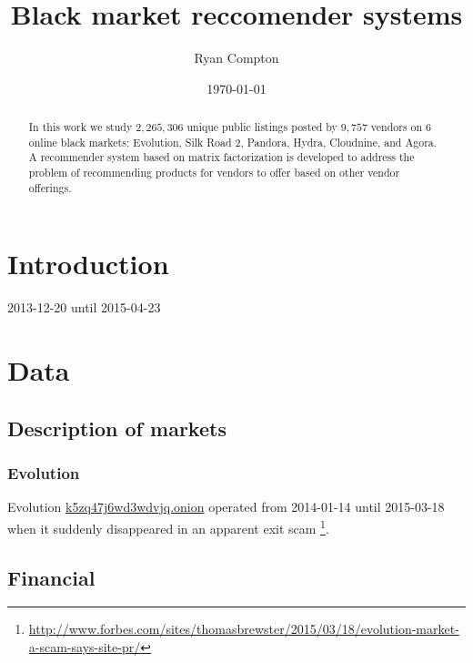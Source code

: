 \documentclass[11pt]{amsart}
\title{Black market reccomender systems}
\author{Ryan Compton}
\date{\today}
\theoremstyle{remark}
\begin{document}
\begin{abstract}

In this work we study $2,265,306$ unique public listings posted by $9,757$ vendors on $6$ online black markets: Evolution, Silk Road 2, Pandora, Hydra, Cloudnine, and Agora. A recommender system based on matrix factorization is developed to address the problem of recommending products for vendors to offer based on other vendor offerings. 



\end{abstract}

\maketitle

\section{Introduction}
\label{sec:introduction}

2013-12-20 until 2015-04-23

\section{Data}
\label{sec:data}

\subsection{Description of markets}

\subsubsection{Evolution}
Evolution \url{k5zq47j6wd3wdvjq.onion} operated from 2014-01-14 until 2015-03-18 when it suddenly disappeared in an apparent exit scam \footnote{\url{http://www.forbes.com/sites/thomasbrewster/2015/03/18/evolution-market-a-scam-says-site-pr/}}.

\subsection{Financial}
\end{document}

